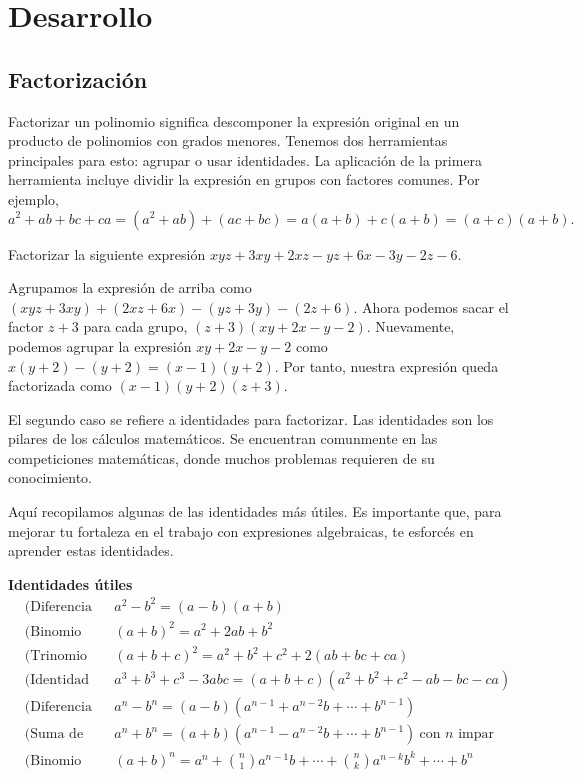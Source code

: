 \section{Desarrollo}

\subsection{Factorización}

Factorizar un polinomio significa descomponer la expresión original en un producto de polinomios con grados menores.
Tenemos dos herramientas principales para esto: agrupar o usar identidades.
La aplicación de la primera herramienta incluye dividir la expresión en grupos con factores comunes.
Por ejemplo,
\[
    a^2 + ab + bc + ca = (a^2 + ab) + (ac + bc) = a(a + b) + c(a + b) = (a + c)(a + b).
\]

\begin{example}
    Factorizar la siguiente expresión $xyz + 3xy + 2xz - yz + 6x - 3y - 2z - 6$.
\end{example}
\begin{solution}
    Agrupamos la expresión de arriba como $(xyz + 3xy) + (2xz + 6x) - (yz + 3y) - (2z + 6)$.
    Ahora podemos sacar el factor $z + 3$ para cada grupo, $(z + 3)(xy + 2x - y - 2)$.
    Nuevamente, podemos agrupar la expresión $xy + 2x - y - 2$ como $x(y + 2) - (y + 2) = (x - 1)(y + 2)$.
    Por tanto, nuestra expresión queda factorizada como $(x - 1)(y + 2)(z + 3)$.
\end{solution}

El segundo caso se refiere a identidades para factorizar.
Las identidades son los pilares de los cálculos matemáticos.
Se encuentran comunmente en las competiciones matemáticas, donde muchos problemas requieren de su conocimiento.

Aquí recopilamos algunas de las identidades más útiles.
Es importante que, para mejorar tu fortaleza en el trabajo con expresiones algebraicas, te esforcés en aprender estas identidades.

\textbf{Identidades útiles}
\begin{align*}
    &\text{(Diferencia de cuadrados)} && a^2 - b^2 = (a - b)(a + b)\\[2mm]
    &\text{(Binomio al cuadrado)}     && (a + b)^2 = a^2 + 2ab + b^2\\[2mm]
    &\text{(Trinomio al cuadrado)}    && (a + b + c)^2 = a^2 + b^2 + c^2 + 2(ab + bc + ca)\\[2mm]
    &\text{(Identidad de Gauss)}      && a^3 + b^3 + c^3 - 3abc = (a + b + c)(a^2 + b^2 + c^2 - ab - bc - ca)\\[2mm]
    &\text{(Diferencia de potencias)} && a^n - b^n = (a - b)(a^{n - 1} + a^{n - 2}b + \cdots + b^{n - 1})\\[2mm]
    &\text{(Suma de potencias)}       && a^n + b^n = (a + b)(a^{n - 1} - a^{n - 2}b + \cdots + b^{n - 1}) \ \text{con $n$ impar}\\[1.5mm]
    &\text{(Binomio de Newton)}       && (a + b)^n = a^n + \binom{n}{1} a^{n - 1}b + \cdots + \binom{n}{k} a^{n -k}b^k + \cdots + b^n
\end{align*}

